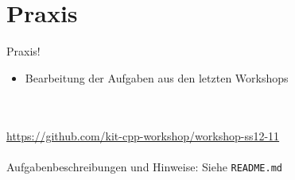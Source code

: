 \section{Praxis}
\begin{frame}[fragile]{Praxis!}
	\begin{itemize}
		\item Bearbeitung der Aufgaben aus den letzten Workshops
	\end{itemize}
	\ \\
	\ \\
	\large{\url{https://github.com/kit-cpp-workshop/workshop-ss12-11}} \\
	\ \\
	Aufgabenbeschreibungen und Hinweise: Siehe \verb|README.md|

\end{frame}
